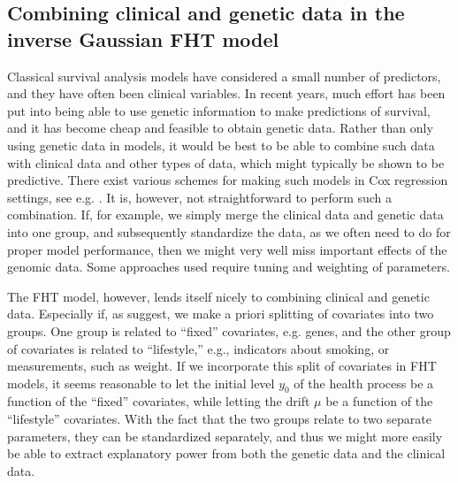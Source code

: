 
\subsection{Combining clinical and genetic data in the inverse Gaussian FHT model}
\label{subsec:FHT-combine}
Classical survival analysis models have considered a small number of predictors, and they have often been clinical variables.
In recent years, much effort has been put into being able to use genetic information to make predictions of survival, and it has become cheap and feasible to obtain genetic data.
Rather than only using genetic data in models, it would be best to be able to combine such data with clinical data and other types of data, which might typically be shown to be predictive.
There exist various schemes for making such models in Cox regression settings, see e.g. \citet{bovelstad2007}.
It is, however, not straightforward to perform such a combination.
If, for example, we simply merge the clinical data and genetic data into one group, and subsequently standardize the data, as we often need to do for proper model performance, then we might very well miss important effects of the genomic data.
Some approaches used require tuning and weighting of parameters.

The FHT model, however, lends itself nicely to combining clinical and genetic data.
Especially if, as \citet{aalengjessing2001} suggest, we make a priori splitting of covariates into two groups.
One group is related to ``fixed'' covariates, e.g. genes, and the other group of covariates is related to ``lifestyle,'' e.g., indicators about smoking, or measurements, such as weight.
If we incorporate this split of covariates in FHT models, it seems reasonable to let the initial level $y_0$ of the health process be a function of the ``fixed'' covariates, while letting the drift $\mu$ be a function of the ``lifestyle'' covariates.
With the fact that the two groups relate to two separate parameters, they can be standardized separately, and thus we might more easily be able to extract explanatory power from both the genetic data and the clinical data.